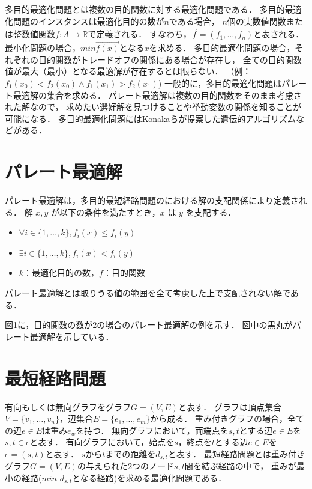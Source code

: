 \documentclass[12pt]{optlab-bachelor}
\begin{document}
多目的最適化問題とは複数の目的関数に対する最適化問題である．
多目的最適化問題のインスタンスは最適化目的の数が$n$である場合，
$n$個の実数値関数または整数値関数$f : A \rightarrow \mathbb{R}$で定義される．
すなわち，$\vec{f} = (f_1 , \ldots , f_n)$と表される．
最小化問題の場合，$min\vec{f(x)}$となる$x$を求める．
多目的最適化問題の場合，それぞれの目的関数がトレードオフの関係にある場合が存在し，
全ての目的関数値が最大（最小）となる最適解が存在するとは限らない．
（例：$f_1(x_0) < f_2(x_0) \land f_1(x_1) > f_2(x_1)$)
一般的に，多目的最適化問題はパレート最適解の集合を求める．
パレート最適解は複数の目的関数をそのまま考慮された解なので，
求めたい選好解を見つけることや挙動変数の関係を知ることが可能になる．
多目的最適化問題にはKonakaら\cite{Konaka}が提案した遺伝的アルゴリズムなどがある．

\section{パレート最適解}
パレート最適解は，多目的最短経路問題のにおける解の支配関係により定義される．
解 $x,y$ が以下の条件を満たすとき，$x$ は $y$ を支配する．
\begin{itemize}
\item $\forall i \in \{1,\ldots,k\},f_i(x) \le f_i(y)$
\item $\exists i \in \{1,\ldots,k\},f_i(x) < f_i(y)$
\item $k$：最適化目的の数，$f$：目的関数
\end{itemize}
パレート最適解とは取りうる値の範囲を全て考慮した上で支配されない解である．

図1に，目的関数の数が2の場合のパレート最適解の例を示す．
図中の黒丸がパレート最適解を示している．

\section{最短経路問題}
有向もしくは無向グラフをグラフ$G=(V,E)$と表す．
グラフは頂点集合$V=\{v_1,\ldots,v_n\}$，辺集合$E=\{e_1,\ldots,e_m\}$から成る．
重み付きグラフの場合，全ての辺$e\in E$は重み$e_w$を持つ．
無向グラフにおいて，両端点を$s,t$とする辺$e \in E$を$s,t \in e$と表す．
有向グラフにおいて，始点を$s$，終点を$t$とする辺$e \in E$を$e=(s,t)$と表す．
$s$から$t$までの距離を$d_{s,t}$と表す．
最短経路問題とは重み付きグラフ$G=(V,E)$の与えられた2つのノード$s,t$間を結ぶ経路の中で，
重みが最小の経路($min$ $d_{s,t}$となる経路)を求める最適化問題である．
\end{document}
